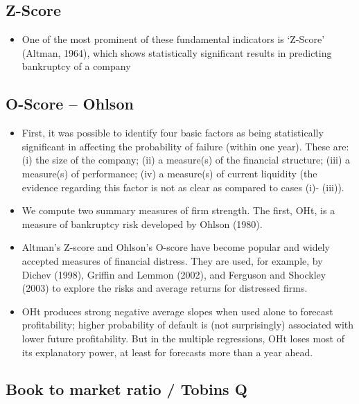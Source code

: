 \documentclass[12pt]{article}
\begin{document}
\subsection{Z-Score}

\begin{itemize}
    \item One of the most prominent of these fundamental indicators is ‘Z-Score’ (Altman, 1964), which shows statistically significant results in predicting bankruptcy of a company \citep{Mohr2012}

\end{itemize}


\subsection{O-Score -- Ohlson}

    \begin{itemize}
        \item First, it was possible to identify four basic factors as being statistically significant in affecting the probability of failure (within one year). These are: (i) the size of the company; (ii) a measure(s) of the financial structure; (iii) a measure(s) of performance; (iv) a measure(s) of current liquidity (the evidence regarding this factor is not as clear as compared to cases (i)- (iii)). \citep{Ohlson1980}
        \item  We compute two summary measures of firm strength. The first, OHt, is a measure of bankruptcy risk developed by Ohlson (1980).\citep{Fama2006}

        \item Altman’s Z-score and Ohlson’s O-score have become popular and widely accepted measures of financial distress. They are used, for example, by Dichev (1998), Griffin and Lemmon (2002), and Ferguson and Shockley (2003) to explore the risks and average returns for distressed firms. \citep{Campbell2008}

        \item OHt produces strong negative average slopes when used alone to forecast profitability; higher probability of default is (not surprisingly) associated with lower future profitability. But in the multiple regressions, OHt loses most of its explanatory power, at least for forecasts more than a year ahead. 

    \end{itemize}
\subsection{Book to market ratio / Tobins Q}
\end{document}
